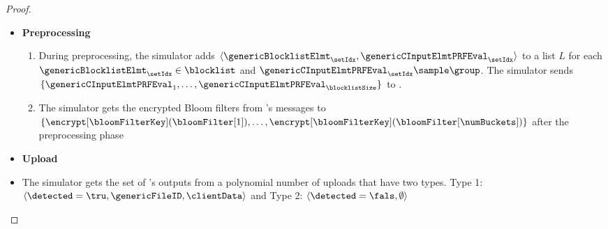 \begin{proof}
\begin{itemize}
\item \textbf{Preprocessing}
\begin{enumerate}[resume]
\item During preprocessing, the simulator adds $\langle \genericBlocklistElmt_\setIdx, \genericCInputElmtPRFEval_\setIdx \rangle$ to a list $L$ for each $\genericBlocklistElmt_\setIdx \in \blocklist$ and $\genericCInputElmtPRFEval_\setIdx \sample \group$. The simulator sends $\{ \genericCInputElmtPRFEval_1, \dots, \genericCInputElmtPRFEval_\blocklistSize \}$ to \server. 
\item The simulator gets the encrypted Bloom filters from \server's messages to \client $\{\encrypt[\bloomFilterKey](\bloomFilter[1]), \dots, \encrypt[\bloomFilterKey](\bloomFilter[\numBuckets])\}$ after the preprocessing phase
\end{enumerate}

\item \textbf{Upload}
\item The simulator gets the set of \server's outputs from a polynomial number of uploads that have two types. Type 1: $\langle \detected = \tru, \genericFileID, \clientData \rangle$ and Type 2: $\langle \detected = \fals, \emptyset \rangle$


\end{itemize}
\end{proof}

